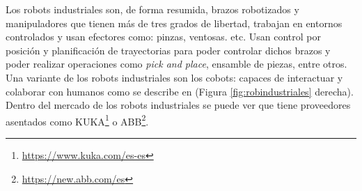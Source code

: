 Los robots industriales son, de forma resumida, brazos robotizados y manipuladores que tienen más de tres grados de libertad, trabajan en entornos controlados y usan efectores como: pinzas, ventosas. etc. Usan control por posición y planificación de trayectorias para poder controlar dichos brazos y poder realizar operaciones como \textit{pick and place}, ensamble de piezas, entre otros. Una variante de los robots industriales son los cobots: capaces de interactuar y colaborar con humanos como se describe en  \cite{ELZAATARI2019162} (Figura \ref{fig:robindustriales} derecha). Dentro del mercado de los robots industriales se puede ver que tiene proveedores asentados como \acs{KUKA}\footnote{\url{https://www.kuka.com/es-es}} o \acs{ABB}\footnote{\url{https://new.abb.com/es}}.



